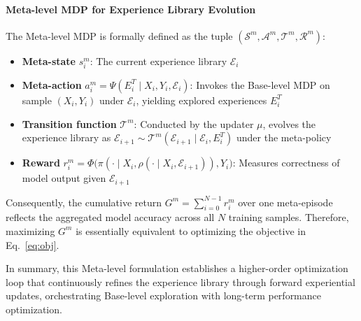 \paragraph{Meta-level MDP for Experience Library Evolution}
\begin{definition}
The Meta-level MDP is formally defined as the tuple $(\mathcal{S}^{m}, \mathcal{A}^{m}, \mathcal{T}^{m}, \mathcal{R}^{m})$:
\begin{itemize}
    \item \textbf{Meta-state} $s^{m}_i$: The current experience library $\mathcal{E}_i$
    \item \textbf{Meta-action} $a^{m}_i = \Psi({E^T_i}\mid X_i,Y_i,\mathcal{E}_i)$: Invokes the Base-level MDP on sample $(X_i,Y_i)$ under $\mathcal{E}_i$, yielding explored experiences ${E^T_i}$
    \item \textbf{Transition function} $\mathcal{T}^{m}$: Conducted by the updater $\mu$, evolves the experience library as $\mathcal{E}_{i+1}\sim\mathcal{T}^{m}(\mathcal{E}_{i+1}\mid \mathcal{E}_i,{E^T_i})$ under the meta-policy
    \item \textbf{Reward} $r^{m}_i = \Phi\big(\pi(\cdot\mid X_i, \rho(\cdot\mid X_i,\mathcal{E}_{i+1})),Y_i\big)$: Measures correctness of model output given $\mathcal{E}_{i+1}$
\end{itemize}
\end{definition}

Consequently, the cumulative return $G^{m} = \sum_{i=0}^{N-1} r^{m}_i$ over one meta-episode reflects the aggregated model accuracy across all $N$ training samples.
Therefore, maximizing $G^{m}$ is essentially equivalent to optimizing the objective in Eq.~\ref{eq:obj}.

In summary, this Meta-level formulation establishes a higher-order optimization loop that continuously refines the experience library through forward experiential updates, orchestrating Base-level exploration with long-term performance optimization.


